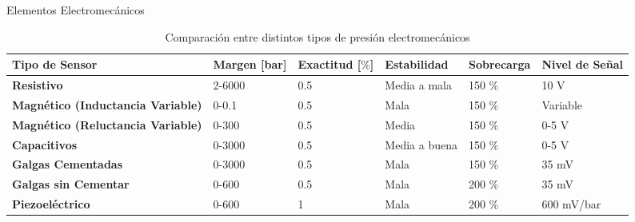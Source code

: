 \documentclass[aspectratio=169]{beamer}
\begin{document}
\begin{frame}{Elementos Electromecánicos }
 \begin{table}[]
 \footnotesize
    \centering
    \begin{tabular}{m{3.2cm} m{1.2cm} m{1.2cm} m{1.9cm} m{1.8cm} m{1.6cm}}
        \toprule
        \textbf{Tipo de Sensor} & \textbf{Margen [bar]} & \textbf{Exactitud [$\%$]} &\textbf{Estabilidad} & \textbf{Sobrecarga} & \textbf{Nivel de Señal} \\
        \midrule
        \textbf{Resistivo} & 2-6000 & 0.5 & Media a mala & 150 \% & 10 V\\
        \textbf{Magnético (Inductancia Variable)} & 0-0.1 & 0.5 & Mala & 150 \% & Variable\\
        \textbf{Magnético (Reluctancia Variable)} & 0-300 & 0.5 & Media & 150 \% & 0-5 V\\
        \textbf{Capacitivos} & 0-3000 & 0.5 & Media a buena & 150 \% & 0-5  V\\
        \textbf{Galgas Cementadas} & 0-3000 & 0.5 & Mala & 150 \% & 35 mV\\
        \textbf{Galgas sin Cementar} & 0-600 & 0.5 & Mala & 200 \% & 35 mV\\
        \textbf{Piezoeléctrico} & 0-600 & 1 & Mala & 200 \% & 600 mV/bar\\
        \bottomrule
    \end{tabular}
    \caption{Comparación entre distintos tipos de presión electromecánicos \cite{sole2005instrumentacion}}
    \label{tab:Comparacion}
\end{table}
\end{frame}
\end{document}
